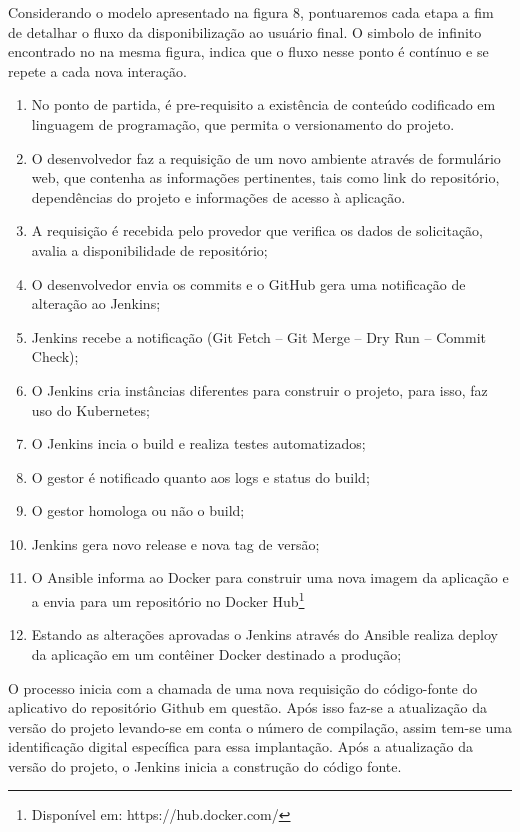 Considerando o modelo apresentado na figura 8, pontuaremos cada etapa a fim de detalhar o fluxo da disponibilização ao usuário final. O simbolo de infinito encontrado no na mesma figura, indica que o fluxo nesse ponto é contínuo e se repete a cada nova interação.

\begin{enumerate}
	\item No ponto de partida, é pre-requisito a existência de conteúdo codificado em linguagem de programação, que permita o versionamento do projeto.
	\item O desenvolvedor faz a requisição de um novo ambiente através de formulário web, que contenha as informações pertinentes, tais como link do repositório, dependências do projeto e informações de acesso à aplicação.
	\item A requisição é recebida pelo provedor que verifica os dados de solicitação, avalia a disponibilidade de repositório;
	\item O desenvolvedor envia os commits e o GitHub gera uma notificação de alteração ao Jenkins;
	\item Jenkins recebe a notificação (Git Fetch – Git Merge – Dry Run – Commit Check);
	\item O Jenkins cria instâncias diferentes para construir o projeto, para isso, faz uso do Kubernetes;
	\item O Jenkins incia o build e realiza testes automatizados;
	\item O gestor é notificado quanto aos logs e status do build;
	\item O gestor homologa ou não o build;
	\item Jenkins gera novo release e nova tag de versão;
\item O Ansible informa ao Docker para construir uma nova imagem da aplicação e a envia para um repositório no Docker Hub\footnote{Disponível em: https://hub.docker.com/}
	\item Estando as alterações aprovadas o Jenkins através do Ansible realiza deploy da aplicação em um contêiner Docker destinado a produção;
\end{enumerate}

O processo inicia com a chamada de uma nova requisição do código-fonte do aplicativo do repositório Github em questão. Após isso faz-se a atualização da versão do projeto levando-se em conta o número de compilação, assim tem-se uma identificação digital específica para essa implantação. Após a atualização da versão do projeto, o Jenkins inicia a construção do código fonte.
    \vspace*{0.5cm}


